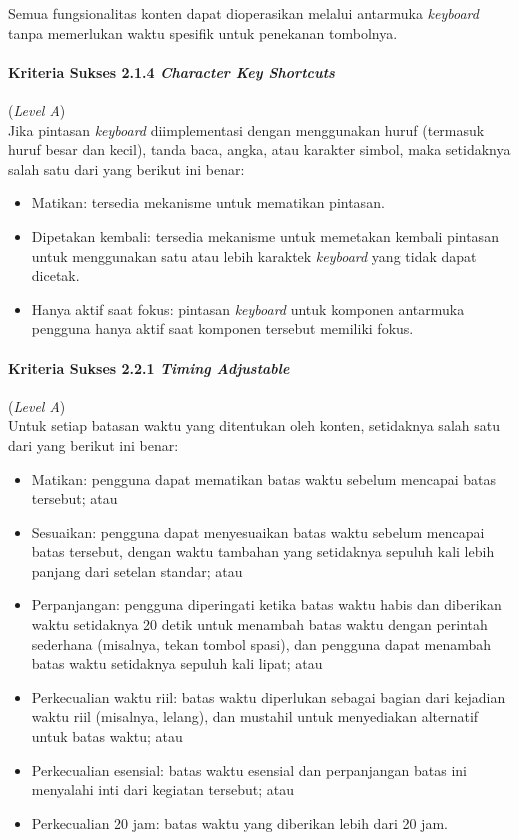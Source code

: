 Semua fungsionalitas konten dapat dioperasikan melalui antarmuka \textit{keyboard} tanpa memerlukan waktu spesifik untuk penekanan tombolnya.

\paragraph{Kriteria Sukses 2.1.4 \textit{Character Key Shortcuts}}
\label{subsec:kriteria_2.1.4}
(\textit{Level A}) \\

Jika pintasan \textit{keyboard} diimplementasi dengan menggunakan huruf (termasuk huruf besar dan kecil), tanda baca, angka, atau karakter simbol, maka setidaknya salah satu dari yang berikut ini benar:

\begin{itemize}
	\item Matikan: tersedia mekanisme untuk mematikan pintasan.
	\item Dipetakan kembali: tersedia mekanisme untuk memetakan kembali pintasan untuk menggunakan satu atau lebih karaktek \textit{keyboard} yang tidak dapat dicetak.
	\item Hanya aktif saat fokus: pintasan \textit{keyboard} untuk komponen antarmuka pengguna hanya aktif saat komponen tersebut memiliki fokus.
\end{itemize}

\paragraph{Kriteria Sukses 2.2.1 \textit{Timing Adjustable}}
\label{subsec:kriteria_2.2.1}
(\textit{Level A}) \\

Untuk setiap batasan waktu yang ditentukan oleh konten, setidaknya salah satu dari yang berikut ini benar:

\begin{itemize}
	\item Matikan: pengguna dapat mematikan batas waktu sebelum mencapai batas tersebut; atau
	\item Sesuaikan: pengguna dapat menyesuaikan batas waktu sebelum mencapai batas tersebut, dengan waktu tambahan yang setidaknya sepuluh kali lebih panjang dari setelan standar; atau
	\item Perpanjangan: pengguna diperingati ketika batas waktu habis dan diberikan waktu setidaknya 20 detik untuk menambah batas waktu dengan perintah sederhana (misalnya, tekan tombol spasi), dan pengguna dapat menambah batas waktu setidaknya sepuluh kali lipat; atau
	\item Perkecualian waktu riil: batas waktu diperlukan sebagai bagian dari kejadian waktu riil (misalnya, lelang), dan mustahil untuk menyediakan alternatif untuk batas waktu; atau
	\item Perkecualian esensial: batas waktu esensial dan perpanjangan batas ini menyalahi inti dari kegiatan tersebut; atau
	\item Perkecualian 20 jam: batas waktu yang diberikan lebih dari 20 jam.
\end{itemize}

